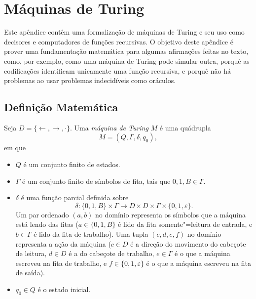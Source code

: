 \chapter{Máquinas de Turing}
\label{app:turing_machines}

Este apêndice contêm uma formalização de máquinas de Turing
e seu uso como decisores e computadores de funções recursivas.
O objetivo deste apêndice é prover uma fundamentação matemática
para algumas afirmações feitas no texto,
como, por exemplo,
como uma máquina de Turing pode simular outra,
porquê as codificações identificam unicamente uma função recursiva,
e porquê não há problemas ao usar problemas indecidíveis como oráculos.

\section{Definição Matemática}

\begin{definition}
    Seja $D = \{\leftarrow, \rightarrow, \cdot\}$.
    Uma \emph{máquina de Turing} $M$ é uma quádrupla
    \begin{equation*}
        M = (Q, \Gamma, \delta, q_0),
    \end{equation*}
    em que
    \begin{itemize}
        \setlength{\labelsep}{1ex}
        \item $Q$ é um conjunto finito de estados.
        \item $\Gamma$ é um conjunto finito de símbolos de fita,
            tais que $0, 1, B \in \Gamma$.
        \item $\delta$ é uma função parcial definida sobre
            \begin{equation*}
                \delta: \{0, 1, B\} \times \Gamma
                    \to D \times D \times \Gamma \times \{0, 1, \varepsilon\}.
            \end{equation*}
            Um par ordenado $(a, b)$ no domínio
            representa os símbolos que a máquina está lendo das fitas
            ($a \in \{0, 1, B\}$ é lido da fita somente"=leitura de entrada,
            e $b \in \Gamma$ é lido da fita de trabalho).
            Uma tupla $(c, d, e, f)$ no domínio
            representa a ação da máquina
            ($c \in D$ é a direção do movimento do cabeçote de leitura,
            $d \in D$ é a do cabeçote de trabalho,
            $e \in \Gamma$ é o que a máquina escreveu na fita de trabalho,
            e $f \in \{0, 1, \varepsilon\}$ é o que a máquina escreveu
            na fita de saída).
        \item $q_0 \in Q$ é o estado inicial.
    \end{itemize}
\end{definition}

